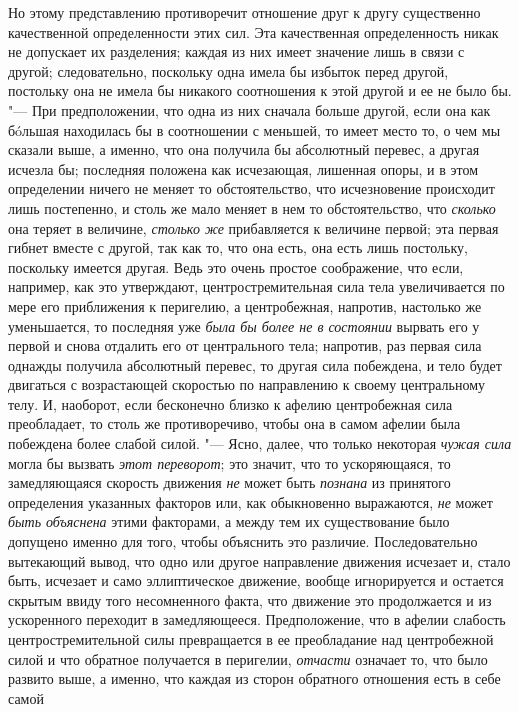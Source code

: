Но этому представлению противоречит отношение друг к другу существенно
качественной определенности этих сил. Эта качественная определенность никак
не допускает их разделения; каждая из них имеет значение лишь в связи с
другой; следовательно, поскольку одна имела бы избыток перед другой,
постольку она не имела бы никакого соотношения к этой другой и ее не было
бы. "--- При предположении, что одна из них сначала больше другой, если она
как бóльшая находилась бы в соотношении с меньшей, то имеет место то, о чем
мы сказали выше, а именно, что она получила бы абсолютный перевес, а другая
исчезла бы; последняя положена как исчезающая, лишенная опоры, и в этом
определении ничего не меняет то обстоятельство, что исчезновение происходит
лишь постепенно, и столь же мало меняет в нем то обстоятельство, что
{\em сколько} она теряет в величине,
{\em столько же} прибавляется к величине первой; эта
первая гибнет вместе с другой, так как то, что она есть, она есть лишь
постольку, поскольку имеется другая. Ведь это очень простое соображение,
что если, например, как это утверждают, центростремительная сила тела
увеличивается по мере его приближения к перигелию, а центробежная,
напротив, настолько же уменьшается, то последняя уже
{\em была бы более не в состоянии} вырвать его у первой
и снова отдалить его от центрального тела; напротив, раз первая сила
однажды получила абсолютный перевес, то другая сила побеждена, и тело будет
двигаться с возрастающей скоростью по направлению к своему центральному
телу. И, наоборот, если бесконечно близко к афелию центробежная сила
преобладает, то столь же противоречиво, чтобы она в самом афелии была
побеждена более слабой силой. "--- Ясно, далее, что только некоторая
{\em чужая сила} могла бы вызвать
{\em этот переворот}; это значит, что то ускоряющаяся,
то замедляющаяся скорость движения {\em не} может быть
{\em познана} из принятого определения указанных
факторов или, как обыкновенно выражаются, {\em не}
может {\em быть объяснена} этими факторами, а между тем
их существование было допущено именно для того, чтобы объяснить это
различие. Последовательно вытекающий вывод, что одно или другое направление
движения исчезает и, стало быть, исчезает и само эллиптическое движение,
вообще игнорируется и остается скрытым ввиду того несомненного факта, что
движение это продолжается и из ускоренного переходит в замедляющееся.
Предположение, что в афелии слабость центростремительной силы превращается
в ее преобладание над центробежной силой и что обратное получается в
перигелии, {\em отчасти} означает то, что было развито
выше, а именно, что каждая из сторон обратного отношения есть в себе самой
